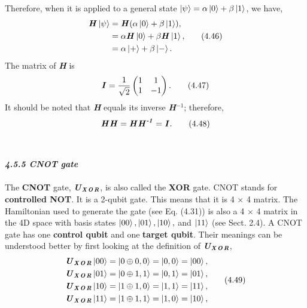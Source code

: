 \documentclass{article}
\newcommand{\bfit}[1]{\textbf{\textit{#1}}}
\begin{document}
Therefore, when it is applied to a general state $\ket{\psi}=\alpha\ket{0}+\beta\ket{1}$,
we have,
\begin{align} \label{eq 4.46}
    \begin{split}
        \bfit{H}\ket{\psi}&=\bfit{H}(\alpha\ket{0}+\beta\ket{1}),\\
        &= \alpha\bfit{H}\ket{0}+\beta\bfit{H}\ket{1},\\
        &=\alpha\ket{+}+\beta\ket{-}.
    \end{split} \tag{4.46}
\end{align}
The matrix of \bfit{H} is
\begin{equation} \label{eq 4.47}
    \bfit{I}=\frac{1}{\sqrt{2}}\begin{pmatrix}
        1 &1\\1 & -1
    \end{pmatrix}. \tag{4.47}
\end{equation}
It should be noted that \bfit{H} equals its inverse \bfit{H$^{-1}$}; therefore,
\begin{equation} \label{eq 4.48}
    \bfit{H}\bfit{H}=\bfit{H}\bfit{H}^{\bfit{-1}}=\bfit{I}. \tag{4.48}
\end{equation}
\\\\
\bfit{\large 4.5.5 CNOT gate}
\\\\
The \textbf{CNOT} gate, \bfit{U}$_{\bfit{X\! O\! R}}$, is also called the \textbf{XOR} gate. CNOT
stands for \textbf{controlled NOT}. It is a 2-qubit gate. This means that it is 
4 $\times$ 4 matrix. The Hamiltonian used to generate the gate (see Eq. (4.31)) is also a 4 $\times$ 4
matrix in the 4D space with basis states $\ket{00}, \ket{01}, \ket{10},$ and $\ket{11}$
(see Sect. 2.4). A CNOT gate has one \textbf{control qubit} and one \textbf{target qubit}.
Their meanings can be understood better by first looking at the definition
of \bfit{U}$_{\bfit{X\! O\! R}}$,
\begin{align} \label{eq 4.49}
    \begin{split}
        \bfit{U}_{\bfit{X\! O\! R}}\ket{00}=\ket{0\oplus0,0}=\ket{0,0}=\ket{00},\\
        \bfit{U}_{\bfit{X\! O\! R}}\ket{01}=\ket{0\oplus1,1}=\ket{0,1}=\ket{01},\\
        \bfit{U}_{\bfit{X\! O\! R}}\ket{10}=\ket{1\oplus1,0}=\ket{1,1}=\ket{11},\\
        \bfit{U}_{\bfit{X\! O\! R}}\ket{11}=\ket{1\oplus1,1}=\ket{1,0}=\ket{10},\\
    \end{split} \tag{4.49}
\end{align}
\end{document}
